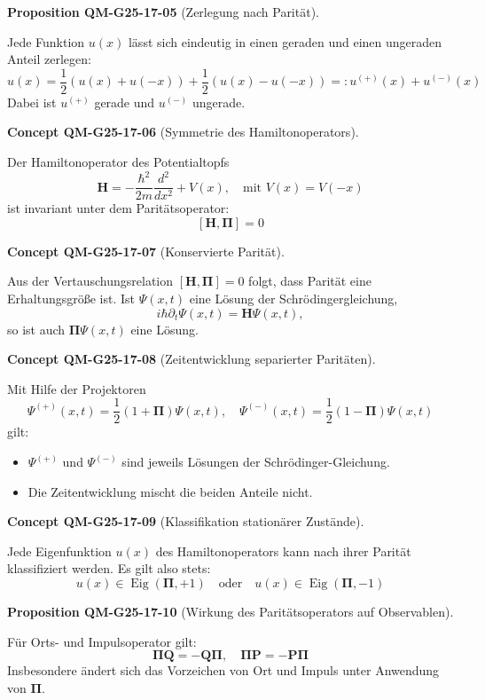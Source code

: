 \documentclass[10pt, letterpaper]{article}
\newcommand{\CustomHeading}[3]{%
  \par\medskip\noindent%
  \textbf{#1 #2} \textnormal{(#3)}.\enskip%
}
\newenvironment{PROP}[2]{\begin{unitbox}\CustomHeading{Proposition}{#1}{#2}}{\end{unitbox}}
\newenvironment{CONC}[2]{\begin{unitbox}\CustomHeading{Concept}{#1}{#2}}{\end{unitbox}}
\begin{document}
\begin{PROP}{QM-G25-17-05}{Zerlegung nach Parität}
Jede Funktion $u(x)$ lässt sich eindeutig in einen geraden und einen ungeraden Anteil zerlegen:
\[
u(x) = \frac{1}{2}(u(x) + u(-x)) + \frac{1}{2}(u(x) - u(-x)) =: u^{(+)}(x) + u^{(-)}(x)
\]
Dabei ist $u^{(+)}$ gerade und $u^{(-)}$ ungerade.
\end{PROP}



\begin{CONC}{QM-G25-17-06}{Symmetrie des Hamiltonoperators}
Der Hamiltonoperator des Potentialtopfs
\[
\mathbf{H} = -\frac{\hbar^2}{2m} \frac{d^2}{dx^2} + V(x), \quad \text{mit } V(x) = V(-x)
\]
ist invariant unter dem Paritätsoperator:
\[
[\mathbf{H}, \boldsymbol{\Pi}] = 0
\]
\end{CONC}

\begin{CONC}{QM-G25-17-07}{Konservierte Parität}
Aus der Vertauschungsrelation $[\mathbf{H}, \boldsymbol{\Pi}] = 0$ folgt, dass Parität eine Erhaltungsgröße ist. Ist $\Psi(x,t)$ eine Lösung der Schrödingergleichung,
\[
i \hbar \partial_t \Psi(x,t) = \mathbf{H} \Psi(x,t),
\]
so ist auch $\boldsymbol{\Pi} \Psi(x,t)$ eine Lösung.
\end{CONC}


\begin{CONC}{QM-G25-17-08}{Zeitentwicklung separierter Paritäten}
Mit Hilfe der Projektoren
\[
\Psi^{(+)}(x, t) = \frac{1}{2}(1 + \boldsymbol{\Pi}) \Psi(x,t), \quad \Psi^{(-)}(x, t) = \frac{1}{2}(1 - \boldsymbol{\Pi}) \Psi(x,t)
\]
gilt:
\begin{itemize}
\item $\Psi^{(+)}$ und $\Psi^{(-)}$ sind jeweils Lösungen der Schrödinger-Gleichung.
\item Die Zeitentwicklung mischt die beiden Anteile nicht.
\end{itemize}
\end{CONC}


\begin{CONC}{QM-G25-17-09}{Klassifikation stationärer Zustände}
Jede Eigenfunktion $u(x)$ des Hamiltonoperators kann nach ihrer Parität klassifiziert werden. Es gilt also stets:
\[
u(x) \in \operatorname{Eig}(\boldsymbol{\Pi}, +1) \quad \text{oder} \quad u(x) \in \operatorname{Eig}(\boldsymbol{\Pi}, -1)
\]
\end{CONC}



\begin{PROP}{QM-G25-17-10}{Wirkung des Paritätsoperators auf Observablen}
Für Orts- und Impulsoperator gilt:
\[
\boldsymbol{\Pi} \mathbf{Q} = -\mathbf{Q} \boldsymbol{\Pi}, \quad \boldsymbol{\Pi} \mathbf{P} = -\mathbf{P} \boldsymbol{\Pi}
\]
Insbesondere ändert sich das Vorzeichen von Ort und Impuls unter Anwendung von $\boldsymbol{\Pi}$.
\end{PROP}
\end{document}
